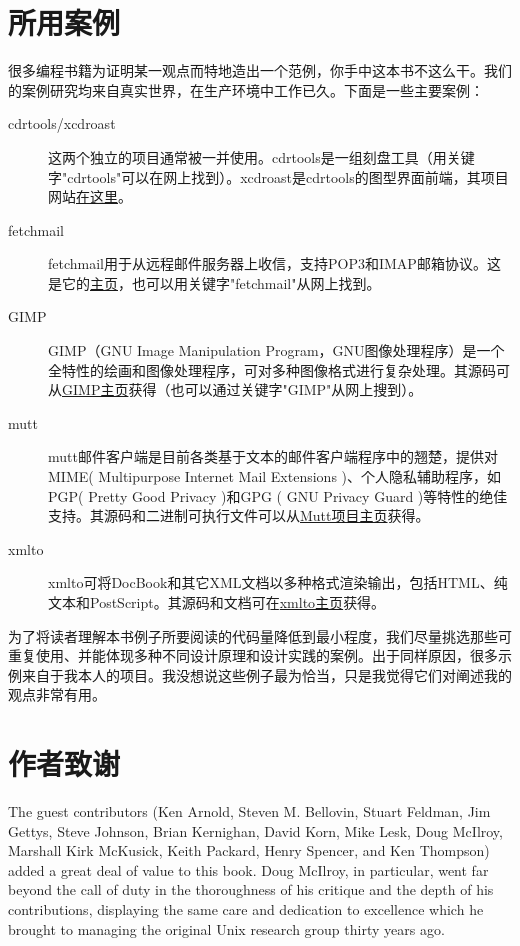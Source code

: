 \documentclass[12pt,oneside]{book}
\begin{document}
\begin{common-format}
\section{所用案例}
很多编程书籍为证明某一观点而特地造出一个范例，你手中这本书不这么干。我们的案例研究均来自真实世界，在生产环境中工作已久。下面是一些主要案例：
\begin{description}
\item[cdrtools/xcdroast] 这两个独立的项目通常被一并使用。cdrtools是一组刻盘工具（用关键字"cdrtools"可以在网上找到）。xcdroast是cdrtools的图型界面前端，其项目网站\href{http://www.xcdroast.org/}{在这里}。
\item[fetchmail] fetchmail用于从远程邮件服务器上收信，支持POP3和IMAP邮箱协议。这是它的\href{http://www.catb.org/~esr/fetchmail}{主页}，也可以用关键字"fetchmail"从网上找到。
\item[GIMP] GIMP（GNU Image Manipulation Program，GNU图像处理程序）是一个全特性的绘画和图像处理程序，可对多种图像格式进行复杂处理。其源码可从\href{http://www.gimp.org/}{GIMP主页}获得（也可以通过关键字"GIMP"从网上搜到）。
\item[mutt] mutt邮件客户端是目前各类基于文本的邮件客户端程序中的翘楚，提供对MIME( Multipurpose Internet Mail Extensions )、个人隐私辅助程序，如PGP( Pretty Good Privacy )和GPG ( GNU Privacy Guard )等特性的绝佳支持。其源码和二进制可执行文件可以从\href{http://www.mutt.org/}{Mutt项目主页}获得。
\item[xmlto] xmlto可将DocBook和其它XML文档以多种格式渲染输出，包括HTML、纯文本和PostScript。其源码和文档可在\href{http://cyberelk.net/tim/xmlto/}{xmlto主页}获得。
\end{description}

为了将读者理解本书例子所要阅读的代码量降低到最小程度，我们尽量挑选那些可重复使用、并能体现多种不同设计原理和设计实践的案例。出于同样原因，很多示例来自于我本人的项目。我没想说这些例子最为恰当，只是我觉得它们对阐述我的观点非常有用。

\section{作者致谢}
The guest contributors (Ken Arnold, Steven M. Bellovin, Stuart Feldman, Jim Gettys, Steve Johnson, Brian Kernighan, David Korn, Mike Lesk, Doug McIlroy, Marshall Kirk McKusick, Keith Packard, Henry Spencer, and Ken Thompson) added a great deal of value to this book. Doug McIlroy, in particular, went far beyond the call of duty in the thoroughness of his critique and the depth of his contributions, displaying the same care and dedication to excellence which he brought to managing the original Unix research group thirty years ago.


\end{common-format}
\end{document}
